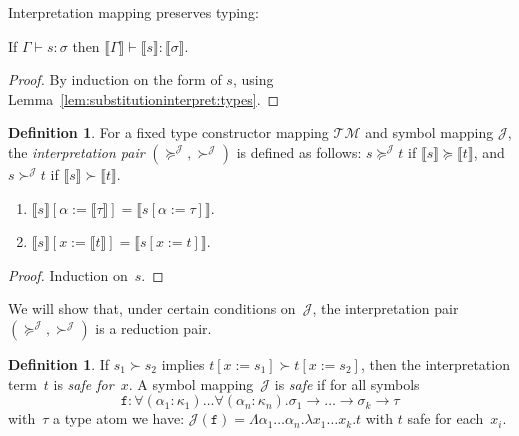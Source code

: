 \documentclass[a4paper,UKenglish,cleveref,autoref,numberwithinsect]{lipics-v2019}
\theoremstyle{definition}
\newtheorem{defn}[theorem]{Definition}
\newcommand{\arrtype}{\rightarrow}
\newcommand{\subst}[2]{#1:=#2}
\newcommand{\abs}[2]{\lambda #1.#2}
\newcommand{\tabs}[2]{\Lambda #1.#2}
\newcommand{\typeinterpret}[1]{\llbracket #1 \rrbracket}
\newcommand{\interpret}[1]{\llbracket #1 \rrbracket}
\newcommand{\itp}[1]{\llbracket #1 \rrbracket}
\newcommand{\Typemap}{\mathcal{T\!M}}
\newcommand{\Termmap}{\mathcal{J}}
\newcommand{\succinterpret}{\succ^{\Termmap}}
\newcommand{\succeqinterpret}{\succeq^{\Termmap}}
\begin{document}
Interpretation mapping preserves typing:

\begin{lemma}
  If $\Gamma \vdash s : \sigma$ then $\itp{\Gamma} \vdash
  \interpret{s} : \typeinterpret{\sigma}$.
\end{lemma}

\begin{proof}
  By induction on the form of $s$, using
  Lemma~\ref{lem:substitutioninterpret:types}.
\end{proof}

\begin{defn}
  For a fixed type constructor mapping $\Typemap$ and symbol mapping
  $\Termmap$, the \emph{interpretation pair}
  $(\succeqinterpret,\succinterpret)$ is defined as follows: $s
  \succeqinterpret t$ if $\interpret{s} \succeq \interpret{t}$, and $s
  \succinterpret t$ if $\interpret{s} \succ \interpret{t}$.
\end{defn}

\begin{lemma}\label{lem:substitutioninterpret}
  \begin{enumerate}
  \item\label{lem:substitutioninterpret:mixed}
    $\interpret{s}[\alpha:=\typeinterpret{\tau}] =
    \interpret{s[\alpha:=\tau]}$.
  \item\label{lem:substitutioninterpret:terms}
    $\interpret{s}[x:=\interpret{t}] = \interpret{s[x:=t]}$.
  \end{enumerate}
\end{lemma}

\begin{proof}
  Induction on~$s$.
\end{proof}

We will show that, under certain conditions on~$\Termmap$, the
interpretation pair $(\succeqinterpret,\succinterpret)$ is a reduction
pair.

\begin{defn}\label{def_safe}
  If $s_1 \succ s_2$ implies $t[\subst{x}{s_1}] \succ
  t[\subst{x}{s_2}]$, then the interpretation term~$t$ is \emph{safe
    for~$x$}. A symbol mapping~$\Termmap$ is \emph{safe} if for all
  symbols
  \[
  \mathtt{f} : \forall (\alpha_1 : \kappa_1) \ldots \forall (\alpha_n
  : \kappa_n) . \sigma_1 \arrtype \ldots \arrtype \sigma_k \arrtype
  \tau
  \]
  with~$\tau$ a type atom we have: $\Termmap(\mathtt{f}) =
  \tabs{\alpha_1 \dots \alpha_n}{\abs{x_1 \dots x_k}{t}}$ with $t$
  safe for each~$x_i$.
\end{defn}
\end{document}
